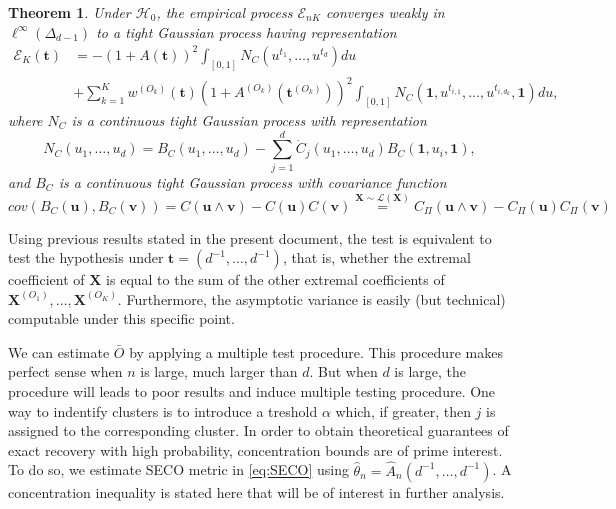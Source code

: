 \documentclass[11pt]{article}
\newtheorem{theorem}{Theorem}
\begin{document}
	\begin{theorem}
		\label{thm:weak_conv}
		Under $\mathcal{H}_0$, the empirical process $\mathcal{E}_{nK}$ converges weakly in $\ell^{\infty}(\Delta_{d-1})$ to a tight Gaussian process having representation
		\begin{align*}
			\mathcal{E}_K(\textbf{t}) &= -\left(1+A(\textbf{t})\right)^2 \int_{[0,1]} N_C(u^{t_1}, \dots, u^{t_d})du \\ &+ \sum_{k=1}^K w^{(O_k)}(\textbf{t})\left(1+A^{(O_k)}(\textbf{t}^{(O_k)})\right)^2 \int_{[0,1]} N_C(\textbf{1},u^{t_{i,1}}, \dots, u^{t_{i,d_k}}, \textbf{1})du,
		\end{align*}
		where $N_C$ is a continuous tight Gaussian process with representation 
		\begin{equation*}
			N_C(u_1,\dots,u_d) = B_C(u_1, \dots, u_d) - \sum_{j=1}^d \dot{C}_j(u_1, \dots, u_d) B_C(\textbf{1}, u_i, \textbf{1}),
		\end{equation*}
		and $B_C$ is a continuous tight Gaussian process with covariance function
		\begin{equation*}
			cov(B_C(\textbf{u}), B_C(\textbf{v})) = C(\textbf{u} \wedge \textbf{v}) - C(\textbf{u})C(\textbf{v}) \overset{\textbf{X}\sim \mathcal{L}(\textbf{X})}{=} C_{\Pi}(\textbf{u} \wedge \textbf{v}) - C_{\Pi}(\textbf{u})C_{\Pi}(\textbf{v})
		\end{equation*}
	\end{theorem}
	Using previous results stated in the present document, the test is equivalent to test the hypothesis under $\textbf{t} = (d^{-1},\dots,d^{-1})$, that is, whether the extremal coefficient of $\textbf{X}$ is equal to the sum of the other extremal coefficients of $\textbf{X}^{(O_1)}, \dots, \textbf{X}^{(O_K)}$. Furthermore, the asymptotic variance is easily (but technical) computable under this specific point.
	
	We can estimate $\bar{O}$ by applying a multiple test procedure. This procedure makes perfect sense when $n$ is large, much larger than $d$. But when $d$ is large, the procedure will leads to poor results and induce multiple testing procedure. One way to indentify clusters is to introduce a treshold $\alpha$ which, if greater, then $j$ is assigned to the corresponding cluster. In order to obtain theoretical guarantees of exact recovery with high probability, concentration bounds are of prime interest. To do so, we estimate SECO metric in \eqref{eq:SECO} using $\hat{\theta}_n = \hat{A}_n(d^{-1},\dots,d^{-1})$. A concentration inequality is stated here that will be of interest in further analysis.
	
\end{document}

